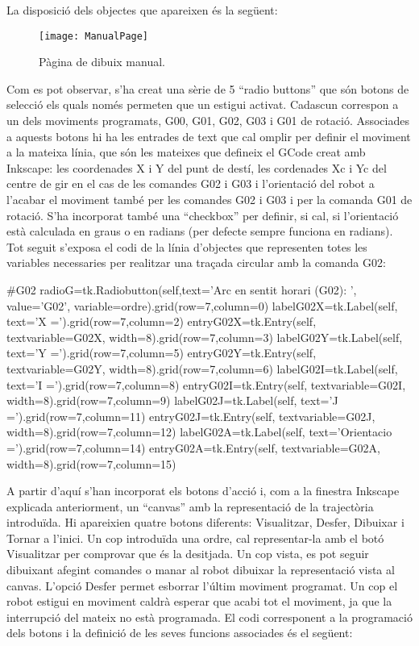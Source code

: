 La disposició dels objectes que apareixen és la següent:

\begin{figure}[H]
	\centering
	\texttt{[image: ManualPage]}
	\caption{Pàgina de dibuix manual.}
	\label{fig:ManualPage}
\end{figure}

Com es pot observar, s’ha creat una sèrie de 5  “radio buttons” que són botons de selecció els quals només permeten que un estigui activat. Cadascun correspon a un dels moviments programats, G00, G01, G02, G03 i G01 de rotació. Associades a aquests botons hi ha les entrades de text que cal omplir per definir el moviment a la mateixa línia, que són les mateixes que defineix el GCode creat amb Inkscape: les coordenades X i Y del punt de destí, les cordenades Xc i Yc del centre de gir en el cas de les comandes G02 i G03 i l’orientació del robot a l'acabar el moviment també per les comandes G02 i G03 i per la comanda G01 de rotació. S’ha incorporat també una “checkbox” per definir, si cal, si l’orientació està calculada en graus o en radians (per defecte sempre funciona en radians). Tot seguit s'exposa el codi de la línia d'objectes que representen totes les variables necessaries per realitzar una traçada circular amb la comanda G02:

\begin{python}
	#G02
	radioG=tk.Radiobutton(self,text='Arc en sentit horari (G02): ', value='G02', variable=ordre).grid(row=7,column=0)
	labelG02X=tk.Label(self, text='X =').grid(row=7,column=2)
	entryG02X=tk.Entry(self, textvariable=G02X, width=8).grid(row=7,column=3)
	labelG02Y=tk.Label(self, text='Y =').grid(row=7,column=5)
	entryG02Y=tk.Entry(self, textvariable=G02Y, width=8).grid(row=7,column=6)
	labelG02I=tk.Label(self, text='I =').grid(row=7,column=8)
	entryG02I=tk.Entry(self, textvariable=G02I, width=8).grid(row=7,column=9)
	labelG02J=tk.Label(self, text='J =').grid(row=7,column=11)
	entryG02J=tk.Entry(self, textvariable=G02J, width=8).grid(row=7,column=12)
	labelG02A=tk.Label(self, text='Orientacio =').grid(row=7,column=14)
	entryG02A=tk.Entry(self, textvariable=G02A, width=8).grid(row=7,column=15)
\end{python}

A partir d’aquí s’han incorporat els botons d’acció i, com a la finestra Inkscape explicada anteriorment, un “canvas” amb la representació de la trajectòria introduïda. Hi apareixien quatre botons diferents: Visualitzar, Desfer, Dibuixar i Tornar a l’inici. Un cop introduïda una ordre, cal representar-la amb el botó Visualitzar per comprovar que és la desitjada. Un cop vista, es pot seguir dibuixant afegint comandes o manar al robot dibuixar la representació vista al canvas. L’opció Desfer permet esborrar l’últim moviment programat. Un cop el robot estigui en moviment caldrà esperar que acabi tot el moviment, ja que la interrupció del mateix no està programada. El codi corresponent a la programació dels botons i la definició de les seves funcions associades és el següent:

